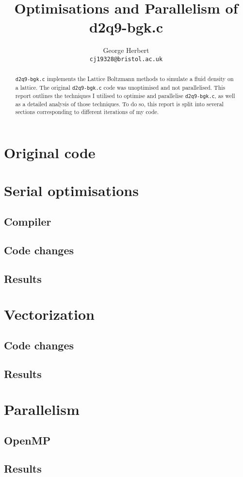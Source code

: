 \documentclass[11pt, a4paper]{article}
\author{
  George Herbert\\
  \texttt{cj19328@bristol.ac.uk}
}
\title{Optimisations and Parallelism of d2q9-bgk.c}
\begin{document}
\maketitle

\begin{abstract}
    \texttt{d2q9-bgk.c} implements the Lattice Boltzmann methods to simulate a fluid density on a lattice.
    The original \texttt{d2q9-bgk.c} code was unoptimised and not parallelised.
    This report outlines the techniques I utilised to optimise and parallelise \texttt{d2q9-bgk.c}, as well as a detailed analysis of those techniques.
    To do so, this report is split into several sections corresponding to different iterations of my code.
\end{abstract}

\section{Original code}

\section{Serial optimisations}

\subsection{Compiler}

\subsection{Code changes}

\subsection{Results}

\section{Vectorization}

\subsection{Code changes}

\subsection{Results}

\section{Parallelism}

\subsection{OpenMP}

\subsection{Results}

\clearpage

\onecolumn{
  \printbibliography
}
\end{document}
